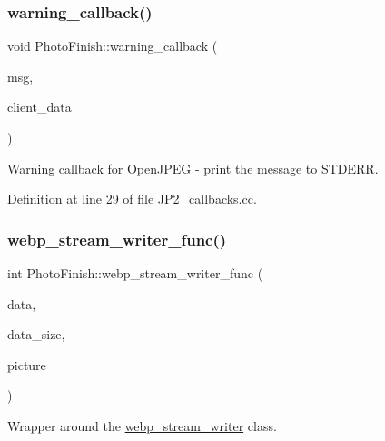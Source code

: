 \mbox{\label{namespace_photo_finish_a5ade5f8f065cbecf79f0d76fed6c1e97}} 
\subsubsection{\texorpdfstring{warning\+\_\+callback()}{warning\_callback()}}
{\footnotesize\ttfamily void Photo\+Finish\+::warning\+\_\+callback (\begin{DoxyParamCaption}\item[{const char $\ast$}]{msg,  }\item[{void $\ast$}]{client\+\_\+data }\end{DoxyParamCaption})}



Warning callback for Open\+J\+P\+EG -\/ print the message to S\+T\+D\+E\+RR. 



Definition at line 29 of file J\+P2\+\_\+callbacks.\+cc.

\mbox{\label{namespace_photo_finish_a1e5838b47b653916bf48abe8aae872ec}} 
\subsubsection{\texorpdfstring{webp\+\_\+stream\+\_\+writer\+\_\+func()}{webp\_stream\_writer\_func()}}
{\footnotesize\ttfamily int Photo\+Finish\+::webp\+\_\+stream\+\_\+writer\+\_\+func (\begin{DoxyParamCaption}\item[{const uint8\+\_\+t $\ast$}]{data,  }\item[{size\+\_\+t}]{data\+\_\+size,  }\item[{const Web\+P\+Picture $\ast$}]{picture }\end{DoxyParamCaption})}



Wrapper around the \hyperlink{class_photo_finish_1_1webp__stream__writer}{webp\+\_\+stream\+\_\+writer} class. 




